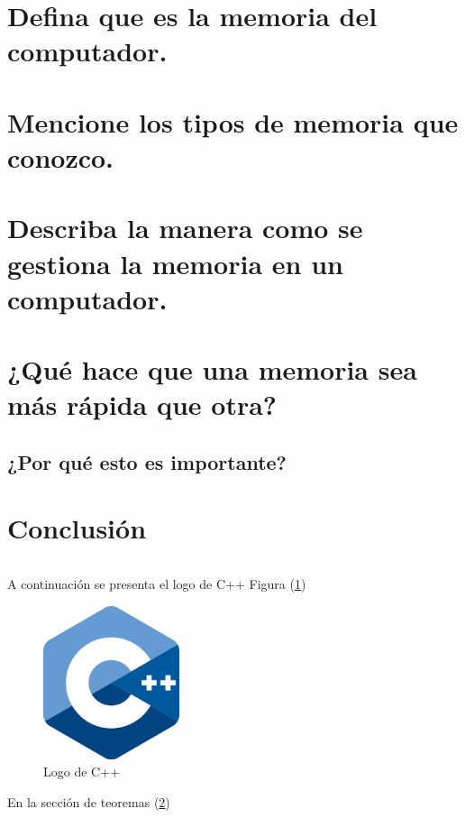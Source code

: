 \documentclass{article}
\begin{document}
\section{Defina que es la memoria del computador.}


\section{Mencione los tipos de memoria que conozco.} \label{contenido}



\section{Describa la manera como se gestiona la memoria en un computador.}



\section{¿Qué hace que una memoria sea más rápida que otra?}

\subsection{¿Por qué esto es importante?}



\section{Conclusión} \label{conclulsion}


\begin{lstlisting}

\end{lstlisting}

A continuación se presenta el logo de C++ Figura (\ref{fig:cpplogo})

\begin{figure}[h]
\includegraphics[width=4cm]{cpplogo.png}
\centering
\caption{Logo de C++}
\label{fig:cpplogo}
\end{figure}

En la sección de teoremas (\ref{contenido})



 

\end{document}
